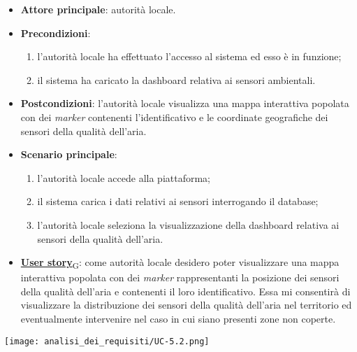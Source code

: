 \begin{itemize}
	\item \textbf{Attore principale}: autorità locale.
	\item \textbf{Precondizioni}:
	      \begin{enumerate}
		      \item l'autorità locale ha effettuato l'accesso al sistema ed esso è in funzione;
		      \item il sistema ha caricato la dashboard relativa ai sensori ambientali.
	      \end{enumerate}
	\item \textbf{Postcondizioni}: l'autorità locale visualizza una mappa interattiva popolata con dei \textit{marker} contenenti l'identificativo e le coordinate geografiche dei sensori della qualità dell'aria.
	\item \textbf{Scenario principale}:
	      \begin{enumerate}
		      \item l'autorità locale accede alla piattaforma;
		      \item il sistema carica i dati relativi ai sensori interrogando il database;
		      \item l'autorità locale seleziona la visualizzazione della dashboard relativa ai sensori della qualità dell'aria.
	      \end{enumerate}
	\item \href{https://7last.github.io/docs/pb/documentazione-interna/glossario\#user-story}{\textbf{User story}\textsubscript{G}}:
	      come autorità locale desidero poter visualizzare una mappa interattiva popolata con dei \textit{marker} rappresentanti la posizione dei sensori della qualità dell'aria
	      e contenenti il loro identificativo. Essa mi consentirà di visualizzare la distribuzione dei sensori della qualità dell'aria nel territorio ed eventualmente intervenire nel caso in cui siano presenti zone non coperte.
\end{itemize}
\begin{center}
	\texttt{[image: analisi\_dei\_requisiti/UC-5.2.png]}
\end{center}


